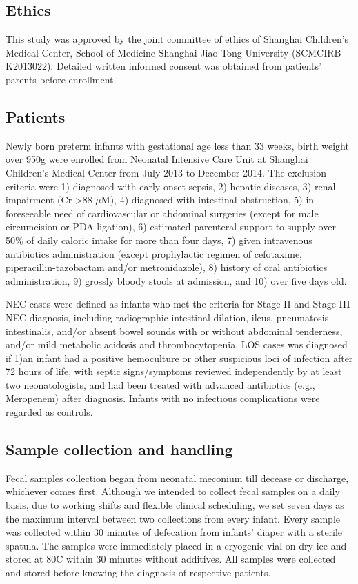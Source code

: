 \documentclass[fleqn,10pt]{wlpeerj} %
\begin{document}
  \subsection*{Ethics}
  This study was approved by the joint committee of ethics of Shanghai Children’s Medical Center, School of Medicine Shanghai Jiao Tong University (SCMCIRB-K2013022). Detailed written informed consent was obtained from patients' parents before enrollment.

  \subsection*{Patients}
  Newly born preterm infants with gestational age less than 33 weeks, birth weight over 950g were enrolled from Neonatal Intensive Care Unit at Shanghai Children’s Medical Center from July 2013 to December 2014. The exclusion criteria were 1) diagnosed with early-onset sepsis, 2) hepatic diseases, 3) renal impairment (Cr \textgreater 88 $\mu$M), 4) diagnosed with intestinal obstruction, 5) in foreseeable need of cardiovascular or abdominal surgeries (except for male circumcision or PDA ligation), 6) estimated parenteral support to supply over 50\% of daily caloric intake for more than four days, 7) given intravenous antibiotics administration (except prophylactic regimen of cefotaxime, piperacillin-tazobactam and/or metronidazole), 8) history of oral antibiotics administration, 9) grossly bloody stools at admission, and 10) over five days old.

  \noindent
  NEC cases were defined as infants who met the criteria for Stage II and Stage III NEC diagnosis\citep{bell1978neonatal}, including radiographic intestinal dilation, ileus, pneumatosis intestinalis, and/or absent bowel sounds with or without abdominal tenderness, and/or mild metabolic acidosis and thrombocytopenia. LOS cases was diagnosed if 1)an infant had a positive hemoculture or other suspicious loci of infection after 72 hours of life, with septic signs/symptoms reviewed independently by at least two neonatologists, and had been treated with advanced antibiotics (e.g., Meropenem) after diagnosis. Infants with no infectious complications were regarded as controls.

  \subsection*{Sample collection and handling}
  Fecal samples collection began from neonatal meconium till decease or discharge, whichever comes first. Although we intended to collect fecal samples on a daily basis, due to working shifts and flexible clinical scheduling, we set seven days as the maximum interval between two collections from every infant. Every sample was collected within 30 minutes of defecation from infants' diaper with a sterile spatula. The samples were immediately placed in a cryogenic vial on dry ice and stored at 80\textdegree{}C within 30 minutes without additives. All samples were collected and stored before knowing the diagnosis of respective patients.
\end{document}
